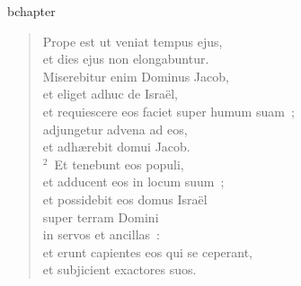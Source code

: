 bchapter\begin{verse}\vspace{-19pt}Prope est ut veniat tempus ejus,\\ et dies ejus non elongabuntur.\\ Miserebitur enim Dominus Jacob,\\ et eliget adhuc de Isra\"el,\\ et requiescere eos faciet super humum suam~;\\ adjungetur advena ad eos,\\ et adh\ae rebit domui Jacob.\\
${}^{2}$~Et tenebunt eos populi,\\ et adducent eos in locum suum~;\\ et possidebit eos domus Isra\"el\\ super terram Domini\\ in servos et ancillas~:\\ et erunt capientes eos qui se ceperant,\\ et subjicient exactores suos.\end{verse}


